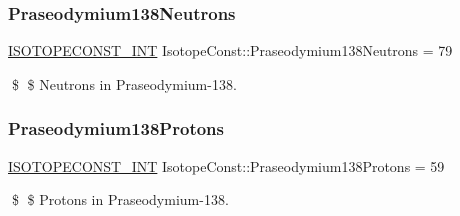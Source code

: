 \subsubsection{\texorpdfstring{Praseodymium138\+Neutrons}{Praseodymium138Neutrons}}
{\footnotesize\ttfamily \mbox{\hyperlink{group___isotope_const-_macros_ga5f18360b3e99483a35c32d789e62621c}{I\+S\+O\+T\+O\+P\+E\+C\+O\+N\+S\+T\+\_\+\+I\+NT}} Isotope\+Const\+::\+Praseodymium138\+Neutrons = 79}

\$ \$ Neutrons in Praseodymium-\/138. \mbox{\label{group___isotope_const-_praseodymium-_pr138_gaaf1b3898e9e6549a817f514b3f154623}} 
\subsubsection{\texorpdfstring{Praseodymium138\+Protons}{Praseodymium138Protons}}
{\footnotesize\ttfamily \mbox{\hyperlink{group___isotope_const-_macros_ga5f18360b3e99483a35c32d789e62621c}{I\+S\+O\+T\+O\+P\+E\+C\+O\+N\+S\+T\+\_\+\+I\+NT}} Isotope\+Const\+::\+Praseodymium138\+Protons = 59}

\$ \$ Protons in Praseodymium-\/138. 